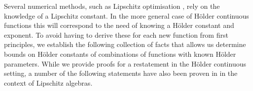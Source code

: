 \documentclass{article} %
\theoremstyle{definition}
\theoremstyle{remark}
\newcommand{\abs}[1]{\left\vert#1\right\vert}
\newcommand{\Real}{\mathbb R}
\begin{document}

Several numerical methods, such as Lipschitz optimisation \cite{Shubert:72}, rely on the knowledge of a Lipschitz constant. In the more general case of H\"older continuous functions this will correspond to the need of knowing a H\"older constant and exponent. To avoid having to derive these for each new function from first principles, we establish the following collection of facts that allows us determine bounds on H\"older constants of combinations of functions with known H\"older parameters.
While we provide proofs for a restatement in the H\"older continuous setting, a number of the following statements have also been proven in \cite{Weaver1999} in the context of Lipschitz algebras.
\end{document}
